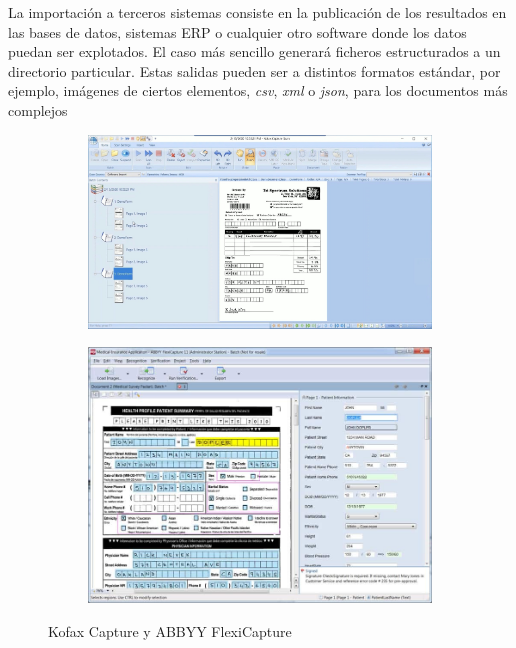 \begin{itemize}
    La importación a terceros sistemas consiste en la publicación de los resultados en las bases de datos, sistemas ERP o cualquier otro software donde los datos puedan ser explotados. El caso más sencillo generará ficheros estructurados a un directorio particular. Estas salidas pueden ser a distintos formatos estándar, por ejemplo, imágenes de ciertos elementos, \emph{\acrshort{csv}}, \emph{\acrshort{xml}} o \emph{\acrshort{json}}, para los documentos más complejos
\end{itemize}

\begin{figure}
    \centering
    \begin{subfigure}[b]{0.9\textwidth}
        \centering
        \includegraphics[width=\textwidth]{imaxes/b-estado-arte/kofax-capture}
        \label{fig:hough-punto-imagen}
    \end{subfigure}
    \begin{subfigure}[b]{0.9\textwidth}
        \centering
        \includegraphics[width=\textwidth]{imaxes/b-estado-arte/abbyy-flexicapture}
        \label{fig:hough-intersection}
    \end{subfigure}
    \caption{Kofax Capture y ABBYY FlexiCapture}
    \label{fig:kofax-capture-y-abbyy-flexicapture}
\end{figure}

